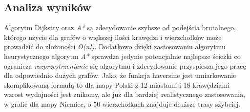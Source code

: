 \documentclass[11pt]{article} %
\begin{document}
\subsection{Analiza wyników}
Algorytm Dijkstry oraz \textsl{A*} są zdecydowanie szybsze od podejścia brutalnego, którego użycie dla grafów o większej ilości krawędzi i wierzchołków może prowadzić do złożoności \textsl{O(n!)}. Dodatkowo dzięki zastosowaniu algorytmu heurystycznego algorytm \textsl{A*} sprawdza jedynie potencjalnie najlepsze ścieżki co ogranicza \textsl{rozprzestrzenianie} się algorytmu i zdecydowanie przyspiesza jego pracę dla odpowiednio dużych grafów. Jako, że funkcja haversine jest umiarkowanie skomplikowaną formułą to dla mapy Polski z 12 miastami i 18 krawędziami wzrost wydajności jest znikomy, ale już dla bardziej realistycznego zastosowania, w grafie dla mapy Niemiec, o 50 wierzchołkach znajduje dłuższe trasy szybciej.
\end{document}
